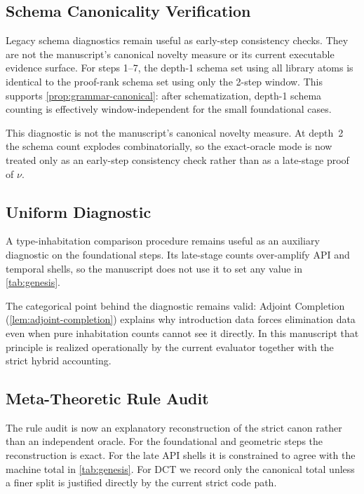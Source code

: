 \documentclass[11pt,a4paper]{article}
\theoremstyle{plain}
\theoremstyle{definition}
\theoremstyle{remark}
\begin{document}
\subsection{Schema Canonicality Verification}

Legacy schema diagnostics remain useful as early-step consistency checks.
They are not the manuscript's canonical novelty measure or its current executable evidence surface.
For steps 1--7, the depth-1 schema set using all library atoms is identical to the proof-rank schema set using only the 2-step window.
This supports \cref{prop:grammar-canonical}: after schematization, depth-1 schema counting is effectively window-independent for the small foundational cases.

This diagnostic is not the manuscript's canonical novelty measure.
At depth~2 the schema count explodes combinatorially, so the exact-oracle mode is now treated only as an early-step consistency check rather than as a late-stage proof of $\nu$.

\subsection{Uniform Diagnostic}
\label{sec:uniform-nu}

A type-inhabitation comparison procedure remains useful as an auxiliary diagnostic on the foundational steps.
Its late-stage counts over-amplify API and temporal shells, so the manuscript does not use it to set any value in \cref{tab:genesis}.

The categorical point behind the diagnostic remains valid:
Adjoint Completion (\cref{lem:adjoint-completion}) explains why introduction data forces elimination data even when pure inhabitation counts cannot see it directly.
In this manuscript that principle is realized operationally by the current evaluator together with the strict hybrid accounting.

\subsection{Meta-Theoretic Rule Audit}
\label{sec:inference-nu}

The rule audit is now an explanatory reconstruction of the strict canon rather than an independent oracle.
For the foundational and geometric steps the reconstruction is exact.
For the late API shells it is constrained to agree with the machine total in \cref{tab:genesis}.
For DCT we record only the canonical total unless a finer split is justified directly by the current strict code path.
\end{document}

